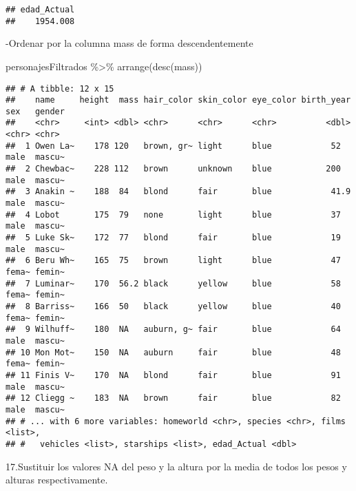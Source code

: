 \documentclass[
]{book}
\newenvironment{Shaded}{\begin{snugshade}}{\end{snugshade}}
\newcommand{\FunctionTok}[1]{\textcolor[rgb]{0.00,0.00,0.00}{#1}}
\newcommand{\NormalTok}[1]{#1}
\newcommand{\SpecialCharTok}[1]{\textcolor[rgb]{0.00,0.00,0.00}{#1}}
\begin{document}
\begin{verbatim}
## edad_Actual 
##    1954.008
\end{verbatim}

-Ordenar por la columna mass de forma descendentemente

\begin{Shaded}
\begin{Highlighting}[]
\NormalTok{personajesFiltrados }\SpecialCharTok{\%\textgreater{}\%} \FunctionTok{arrange}\NormalTok{(}\FunctionTok{desc}\NormalTok{(mass))}
\end{Highlighting}
\end{Shaded}

\begin{verbatim}
## # A tibble: 12 x 15
##    name     height  mass hair_color skin_color eye_color birth_year sex   gender
##    <chr>     <int> <dbl> <chr>      <chr>      <chr>          <dbl> <chr> <chr> 
##  1 Owen La~    178 120   brown, gr~ light      blue            52   male  mascu~
##  2 Chewbac~    228 112   brown      unknown    blue           200   male  mascu~
##  3 Anakin ~    188  84   blond      fair       blue            41.9 male  mascu~
##  4 Lobot       175  79   none       light      blue            37   male  mascu~
##  5 Luke Sk~    172  77   blond      fair       blue            19   male  mascu~
##  6 Beru Wh~    165  75   brown      light      blue            47   fema~ femin~
##  7 Luminar~    170  56.2 black      yellow     blue            58   fema~ femin~
##  8 Barriss~    166  50   black      yellow     blue            40   fema~ femin~
##  9 Wilhuff~    180  NA   auburn, g~ fair       blue            64   male  mascu~
## 10 Mon Mot~    150  NA   auburn     fair       blue            48   fema~ femin~
## 11 Finis V~    170  NA   blond      fair       blue            91   male  mascu~
## 12 Cliegg ~    183  NA   brown      fair       blue            82   male  mascu~
## # ... with 6 more variables: homeworld <chr>, species <chr>, films <list>,
## #   vehicles <list>, starships <list>, edad_Actual <dbl>
\end{verbatim}

17.Sustituir los valores NA del peso y la altura por la media de todos los pesos y alturas respectivamente.
\end{document}
